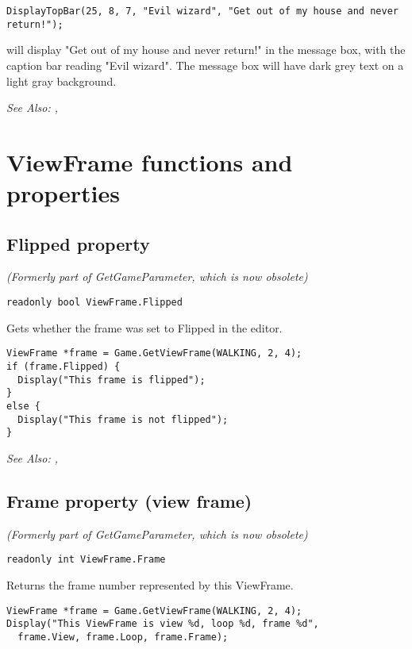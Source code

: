 \begin{verbatim}
DisplayTopBar(25, 8, 7, "Evil wizard", "Get out of my house and never return!");
\end{verbatim}
will display "Get out of my house and never return!" in the message box, with the
caption bar reading "Evil wizard". The message box will have dark grey text on a light
gray background.

\it{See Also:} , 


\section{ViewFrame functions and properties}


\subsection{Flipped property}\label{ViewFrame.Flipped}%

\it{(Formerly part of GetGameParameter, which is now obsolete)}

\begin{verbatim}
readonly bool ViewFrame.Flipped
\end{verbatim}
Gets whether the frame was set to Flipped in the editor.

\begin{verbatim}
ViewFrame *frame = Game.GetViewFrame(WALKING, 2, 4);
if (frame.Flipped) {
  Display("This frame is flipped");
}
else {
  Display("This frame is not flipped");
}
\end{verbatim}

\it{See Also:} ,


\subsection{Frame property (view frame)}\label{ViewFrame.Frame}%

\it{(Formerly part of GetGameParameter, which is now obsolete)}

\begin{verbatim}
readonly int ViewFrame.Frame
\end{verbatim}
Returns the frame number represented by this ViewFrame.

\begin{verbatim}
ViewFrame *frame = Game.GetViewFrame(WALKING, 2, 4);
Display("This ViewFrame is view %d, loop %d, frame %d",
  frame.View, frame.Loop, frame.Frame);
\end{verbatim}


